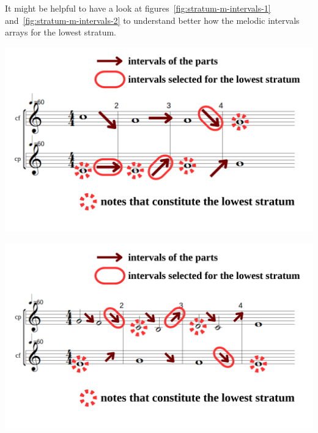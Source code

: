 \noindent It might be helpful to have a look at figures~\ref{fig:stratum-m-intervals-1} and~\ref{fig:stratum-m-intervals-2} to understand better how the melodic intervals arrays for the lowest stratum.

\vspace{.5cm}
\begin{minipage}{0.46\textwidth}
    \centering
    \includegraphics[width=\textwidth]{Images/stratum-m-intervals.png}
    \label{fig:stratum-m-intervals-1}
    \end{minipage}
    \hfill
    \begin{minipage}{0.46\textwidth}
      \centering
      \includegraphics[width=\textwidth]{Images/stratum-m-intervals2.png}
      \label{fig:stratum-m-intervals-2}
\end{minipage}

